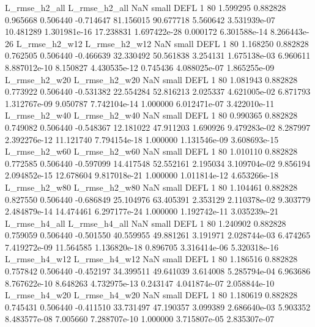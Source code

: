  L_rmse_h2_all  L_rmse_h2_all                   NaN      small     DEFL                 1 80 1.599295       0.882828 0.965668       0.506440   -0.714647     81.156015     90.677718     5.560642   3.531939e-07 10.481289 1.301981e-16    17.238831   1.697422e-28            0.000172    6.301588e-14        8.266443e-26
 L_rmse_h2_w12  L_rmse_h2_w12                   NaN      small     DEFL                 1 80 1.168250       0.882828 0.762505       0.506440   -0.466639     32.330492     50.561838     3.254131   1.675138e-03  6.960611 8.887012e-10     8.150827   4.430535e-12            0.745436    4.088025e-07        1.865255e-09
 L_rmse_h2_w20  L_rmse_h2_w20                   NaN      small     DEFL                 1 80 1.081943       0.882828 0.773922       0.506440   -0.531382     22.554284     52.816213     2.025337   4.621005e-02  6.871793 1.312767e-09     9.050787   7.742104e-14            1.000000    6.012471e-07        3.422010e-11
 L_rmse_h2_w40  L_rmse_h2_w40                   NaN      small     DEFL                 1 80 0.990365       0.882828 0.749082       0.506440   -0.548367     12.181022     47.911203     1.690926   9.479283e-02  8.287997 2.392276e-12    11.121740   7.794154e-18            1.000000    1.131546e-09        3.608693e-15
 L_rmse_h2_w60  L_rmse_h2_w60                   NaN      small     DEFL                 1 80 1.010110       0.882828 0.772585       0.506440   -0.597099     14.417548     52.552161     2.195034   3.109704e-02  9.856194 2.094852e-15    12.678604   9.817018e-21            1.000000    1.011814e-12        4.653266e-18
 L_rmse_h2_w80  L_rmse_h2_w80                   NaN      small     DEFL                 1 80 1.104461       0.882828 0.827550       0.506440   -0.686849     25.104976     63.405391     2.353129   2.110378e-02  9.303779 2.484879e-14    14.474461   6.297177e-24            1.000000    1.192742e-11        3.035239e-21
 L_rmse_h4_all  L_rmse_h4_all                   NaN      small     DEFL                 1 80 1.240902       0.882828 0.759059       0.506440   -0.501550     40.559955     49.881261     3.191971   2.028744e-03  6.474265 7.419272e-09    11.564585   1.136820e-18            0.896705    3.316414e-06        5.320318e-16
 L_rmse_h4_w12  L_rmse_h4_w12                   NaN      small     DEFL                 1 80 1.186516       0.882828 0.757842       0.506440   -0.452197     34.399511     49.641039     3.614008   5.285794e-04  6.963686 8.767622e-10     8.648263   4.732975e-13            0.243147    4.041874e-07        2.058844e-10
 L_rmse_h4_w20  L_rmse_h4_w20                   NaN      small     DEFL                 1 80 1.180619       0.882828 0.745431       0.506440   -0.411510     33.731497     47.190357     3.099389   2.686640e-03  5.903352 8.483577e-08     7.005660   7.288707e-10            1.000000    3.715807e-05        2.835307e-07
